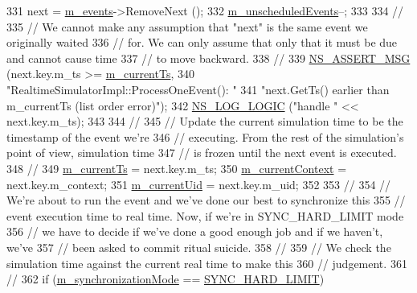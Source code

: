 \begin{DoxyCode}
331     next = \hyperlink{classns3_1_1RealtimeSimulatorImpl_a0cccd690eafca8285f5cc4d3909a9593}{m\_events}->RemoveNext ();
332     \hyperlink{classns3_1_1RealtimeSimulatorImpl_a1ef7b74c3be3d3febb1f07f8db44fb76}{m\_unscheduledEvents}--;
333 
334     \textcolor{comment}{//}
335     \textcolor{comment}{// We cannot make any assumption that "next" is the same event we originally waited }
336     \textcolor{comment}{// for.  We can only assume that only that it must be due and cannot cause time }
337     \textcolor{comment}{// to move backward.}
338     \textcolor{comment}{//}
339     \hyperlink{assert_8h_aff5ece9066c74e681e74999856f08539}{NS\_ASSERT\_MSG} (next.key.m\_ts >= \hyperlink{classns3_1_1RealtimeSimulatorImpl_a613ff41dee1e66129c4d5cc81c00cf60}{m\_currentTs},
340                    \textcolor{stringliteral}{"RealtimeSimulatorImpl::ProcessOneEvent(): "}
341                    \textcolor{stringliteral}{"next.GetTs() earlier than m\_currentTs (list order error)"});
342     \hyperlink{group__logging_ga88acd260151caf2db9c0fc84997f45ce}{NS\_LOG\_LOGIC} (\textcolor{stringliteral}{"handle "} << next.key.m\_ts);
343 
344     \textcolor{comment}{// }
345     \textcolor{comment}{// Update the current simulation time to be the timestamp of the event we're }
346     \textcolor{comment}{// executing.  From the rest of the simulation's point of view, simulation time}
347     \textcolor{comment}{// is frozen until the next event is executed.}
348     \textcolor{comment}{//}
349     \hyperlink{classns3_1_1RealtimeSimulatorImpl_a613ff41dee1e66129c4d5cc81c00cf60}{m\_currentTs} = next.key.m\_ts;
350     \hyperlink{classns3_1_1RealtimeSimulatorImpl_a4b9c6ce7a99f0b0a6e115eb3d427976c}{m\_currentContext} = next.key.m\_context;
351     \hyperlink{classns3_1_1RealtimeSimulatorImpl_a74f7fe3f1ca8b69baac6261b11f1c2a6}{m\_currentUid} = next.key.m\_uid;
352 
353     \textcolor{comment}{// }
354     \textcolor{comment}{// We're about to run the event and we've done our best to synchronize this}
355     \textcolor{comment}{// event execution time to real time.  Now, if we're in SYNC\_HARD\_LIMIT mode}
356     \textcolor{comment}{// we have to decide if we've done a good enough job and if we haven't, we've}
357     \textcolor{comment}{// been asked to commit ritual suicide.}
358     \textcolor{comment}{//}
359     \textcolor{comment}{// We check the simulation time against the current real time to make this}
360     \textcolor{comment}{// judgement.}
361     \textcolor{comment}{//}
362     \textcolor{keywordflow}{if} (\hyperlink{classns3_1_1RealtimeSimulatorImpl_a55d84defcf54c7751df163578ea90872}{m\_synchronizationMode} == \hyperlink{classns3_1_1RealtimeSimulatorImpl_a97b84e6926b9602a6d7c7326bf485807ada42280d3e94930f3335552b4a93a36d}{SYNC\_HARD\_LIMIT})

\end{DoxyCode}
